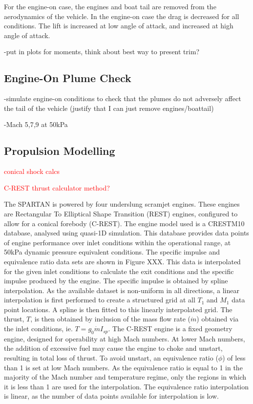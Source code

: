 For the engine-on case, the engines and boat tail are removed from the aerodynamics of the vehicle. In the engine-on case the drag is decreased for all conditions. The lift is increased at low angle of attack, and increased at high angle of attack.


-put in plots for moments, think about best way to present trim?

\subsection{Engine-On Plume Check}
-simulate engine-on conditions to check that the plumes do not adversely affect the tail of the vehicle (justify that I can just remove engines/boattail)

-Mach 5,7,9 at 50kPa
		
		\subsection{Propulsion Modelling}
		
		\textcolor{red}{conical shock calcs}
		
		\textcolor{red}{C-REST thrust calculator method?}
		
		The SPARTAN is powered by four underslung scramjet engines. These engines are Rectangular To Elliptical Shape Transition (REST) engines, configured to allow for a conical forebody (C-REST). The engine model used is a CRESTM10 database\cite{Preller2017}, analysed using quasi-1D simulation.
	This database provides data points of engine performance over inlet conditions within the operational range, at 50kPa dynamic pressure equivalent conditions. The specific impulse and equivalence ratio data sets are shown in Figure XXX. This data is interpolated for the given inlet conditions to calculate the exit conditions and the specific impulse produced by the engine. The specific impulse is obtained by spline interpolation. As the available dataset is non-uniform in all directions, a linear interpolation is first performed to create a structured grid at all $T_1$ and $M_1$ data point locations. A spline is then fitted to this linearly interpolated grid. The thrust, $T$, is then obtained by inclusion of the mass flow rate ($\dot{m}$) obtained via the inlet conditions, ie. $T = g_0\dot{m}I_{sp}$.
	The C-REST engine is a fixed geometry engine, designed for operability at high Mach numbers\cite{Preller2017}. At lower Mach numbers, the addition of excessive fuel may cause the engine to choke and unstart, resulting in total loss of thrust\cite{Preller2017}. To avoid unstart, an equivalence ratio ($\phi$) of less than 1 is set at low Mach numbers. As the equivalence ratio is equal to 1 in the majority of the Mach number and temperature regime, only the regions in which it is less than 1 are used for the interpolation. The equivalence ratio interpolation is linear, as the number of data points available for interpolation is low. 
	
